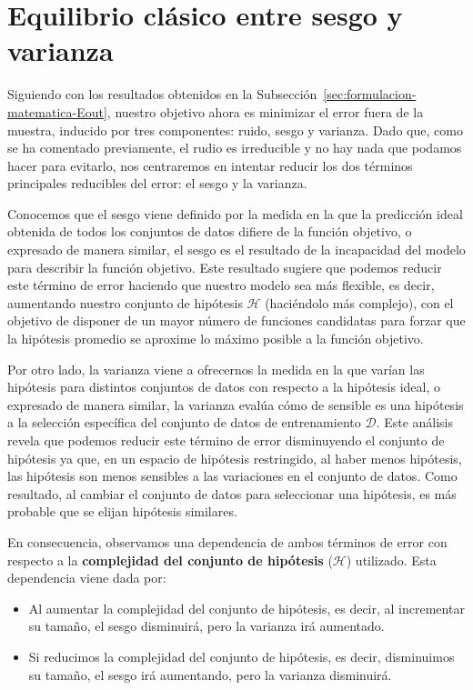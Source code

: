 \section{Equilibrio clásico entre sesgo y varianza}\label{sec:equilibrio-sesgo-varianza}
Siguiendo con los resultados obtenidos en la Subsección~\ref{sec:formulacion-matematica-Eout}, nuestro objetivo ahora es minimizar el error fuera de la muestra, inducido por tres componentes: ruido, sesgo y varianza. Dado que, como se ha comentado previamente, el rudio es irreducible y no hay nada que podamos hacer para evitarlo, nos centraremos en intentar reducir los dos términos principales reducibles del error: el sesgo y la varianza.

Conocemos que el sesgo viene definido por la medida en la que la predicción ideal obtenida de todos los conjuntos de datos difiere de la función objetivo, o expresado de manera similar, el sesgo es el resultado de la incapacidad del modelo para describir la función objetivo. Este resultado sugiere que podemos reducir este término de error haciendo que nuestro modelo sea más flexible, es decir, aumentando nuestro conjunto de hipótesis $\mathcal{H}$ (haciéndolo más complejo), con el objetivo de disponer de un mayor número de funciones candidatas para forzar que la hipótesis promedio se aproxime lo máximo posible a la función objetivo.

Por otro lado, la varianza viene a ofrecernos la medida en la que varían las hipótesis para distintos conjuntos de datos con respecto a la hipótesis ideal, o expresado de manera similar, la varianza evalúa cómo de sensible es una hipótesis a la selección específica del conjunto de datos de entrenamiento $\mathcal{D}$. Este análisis revela que podemos reducir este término de error disminuyendo el conjunto de hipótesis ya que, en un espacio de hipótesis restringido, al haber menos hipótesis, las hipótesis son menos sensibles a las variaciones en el conjunto de datos. Como resultado, al cambiar el conjunto de datos para seleccionar una hipótesis, es más probable que se elijan hipótesis similares.

En consecuencia, observamos una dependencia de ambos términos de error con respecto a la \textbf{complejidad del conjunto de hipótesis} ($\mathcal{H}$) utilizado. Esta dependencia viene dada por:

\begin{itemize}
    \item Al aumentar la complejidad del conjunto de hipótesis, es decir, al incrementar su tamaño, el sesgo disminuirá, pero la varianza irá aumentado.
    \item Si reducimos la complejidad del conjunto de hipótesis, es decir, disminuimos su tamaño, el sesgo irá aumentando, pero la varianza disminuirá.
\end{itemize}

